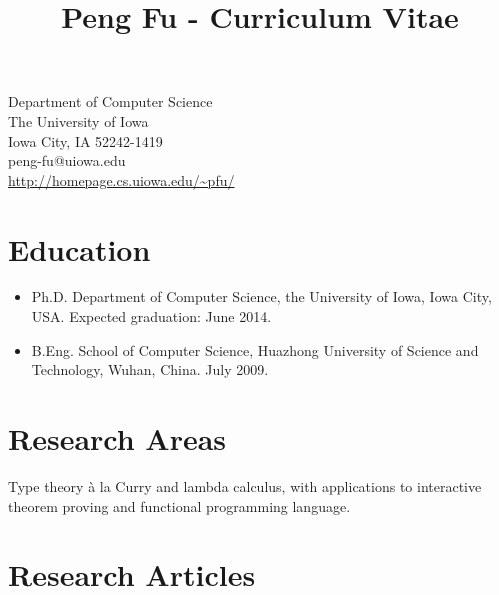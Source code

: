 \documentclass[10pt]{article}
\title{\bfseries\Large Peng Fu - Curriculum Vitae}
\date{}
\begin{document}
\maketitle
\vspace{-4em}
\begin{center}
\begin{minipage}[c]{0.48\textwidth}
Department of Computer Science\\
The University of Iowa\\
Iowa City, IA 52242-1419\\
peng-fu@uiowa.edu\\
\url{http://homepage.cs.uiowa.edu/~pfu/}
\end{minipage}
\end{center}
\vspace{20pt}

\section*{Education}


\begin{itemize}
\item   Ph.D. Department of Computer Science, the University of Iowa, Iowa City, USA. Expected graduation: June 2014.
  \item B.Eng. School of Computer Science, Huazhong University of Science and Technology, Wuhan, China. July 2009.
\end{itemize}


\section*{Research Areas}
Type theory \`a la Curry and lambda calculus, with applications to interactive theorem proving and functional programming language. 


\section*{Research Articles}
\end{document}
